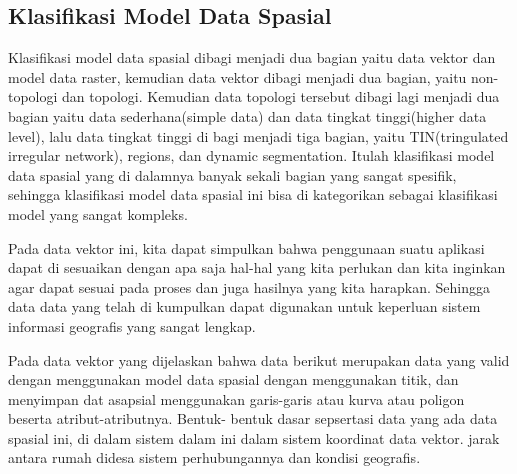 \subsection{Klasifikasi Model Data Spasial}
Klasifikasi model data spasial dibagi menjadi dua bagian yaitu data vektor dan model data raster, kemudian data vektor dibagi menjadi dua bagian, yaitu non-topologi dan topologi. Kemudian data topologi tersebut dibagi lagi menjadi dua bagian yaitu data sederhana(simple data) dan data tingkat tinggi(higher data level), lalu data tingkat tinggi di bagi menjadi tiga bagian, yaitu TIN(tringulated irregular network), regions, dan dynamic segmentation. Itulah klasifikasi model data spasial yang di dalamnya banyak sekali bagian yang sangat spesifik, sehingga klasifikasi model data spasial ini bisa di kategorikan sebagai klasifikasi model yang sangat kompleks.

Pada data vektor ini, kita dapat simpulkan bahwa penggunaan suatu aplikasi dapat di sesuaikan dengan apa saja hal-hal yang kita perlukan dan kita inginkan agar dapat sesuai pada proses dan juga hasilnya yang kita harapkan. Sehingga data data yang telah di kumpulkan dapat digunakan untuk keperluan sistem informasi geografis yang sangat lengkap.

Pada data vektor yang dijelaskan bahwa data berikut merupakan data yang valid dengan menggunakan model data spasial dengan menggunakan titik, dan menyimpan dat asapsial menggunakan garis-garis atau kurva atau poligon beserta atribut-atributnya. Bentuk- bentuk dasar sepsertasi data yang ada data spasial ini, di dalam sistem dalam ini dalam sistem koordinat data vektor. jarak antara rumah didesa sistem perhubungannya dan kondisi geografis.
\cite{Budiyanto2002sistem}
